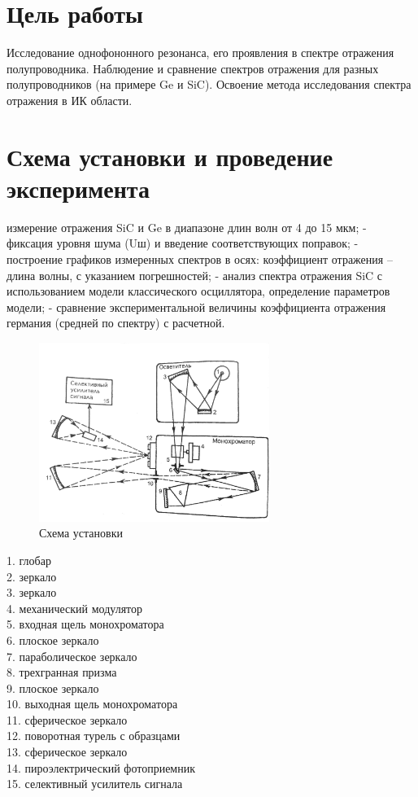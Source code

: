 \documentclass[a4paper,11pt]{report}\usepackage[]{graphicx}\usepackage[]{color}
\begin{document}


\section*{Цель работы} 
Исследование однофононного резонанса, его проявления в спектре отражения полупроводника. Наблюдение и сравнение спектров отражения для разных полупроводников (на примере Ge и SiC). Освоение метода исследования спектра отражения в ИК области.

\section*{Схема установки и проведение эксперимента}
 измерение отражения SiC и Ge в диапазоне длин волн от 4 до 15 мкм;
- фиксация уровня шума (Uш) и введение соответствующих поправок;
- построение графиков измеренных спектров в осях: коэффициент отражения – длина волны, с указанием погрешностей;
- анализ спектра отражения SiC с использованием модели классического осциллятора, определение параметров модели;
- сравнение экспериментальной величины коэффициента отражения германия (средней по спектру) с расчетной. \\

\begin{figure}
  \includegraphics[width=7.5cm]{scheme}
  \caption{Схема установки} 
  \label{img:scheme}  
\end{figure} 


1. глобар \\
2. зеркало \\
3. зеркало \\
4. механический модулятор \\
5. входная щель монохроматора \\
6. плоское зеркало \\
7. параболическое зеркало \\
8. трехгранная призма \\
9. плоское зеркало \\
10. выходная щель монохроматора \\
11. сферическое зеркало \\
12. поворотная турель с образцами \\
13. сферическое зеркало \\
14. пироэлектрический фотоприемник \\
15. селективный усилитель сигнала \\
\end{document}
